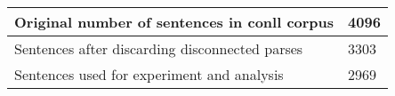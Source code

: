 	\begin{tabular}{|l|l|}
		\hline
		Original number of sentences in conll corpus & 4096\\ 
		\hline
		Sentences after discarding disconnected parses & 3303\\ 
		\hline
		Sentences used for experiment and analysis & 2969\\ 
		\hline
	\end{tabular}
